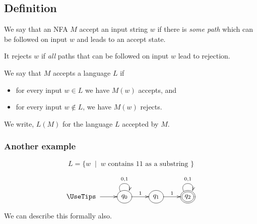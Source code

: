 \documentclass[xcolor=table]{beamer}
\begin{document}
\subsection[definition]{Definition}

\begin{frame}

  \bigskip
  \begin{Definition}
    We say that \alert{an NFA $M$ accept an input string} $w$ if there
    is {\em some path\/} which can be followed on input $w$ and leads
    to an accept state.

    \medskip
    It \alert{rejects} $w$ if {\em all\/} paths that can be followed
	on input $w$ lead to rejection.
  \end{Definition}


  \bigskip
  \begin{Definition}
    We say that
      \alert{$M$ accepts a language $L$} if
      
      \begin{itemize}
	\item for every input $w\in L$ we have $M(w)$ accepts, and
      
	\item for every input $w\not\in L$, we have $M(w)$ rejects. 
      \end{itemize}

      We write, $L(M)$ for the language $L$ accepted by $M$.
      \end{Definition}

  
\end{frame}


\begin{frame}
  \frametitle{Another example}

  \begin{block}{}
  \[ L = \{  w \; \mid \; w \mbox{ contains 11 as a substring } \}\]
  \end{block}

  \[\UseTips
  \xymatrix {
      *+\txt{\ } \ar[r] & *++[o][F]{q_0} \ar@(ul,ur)^{0,1}
  \ar[r]^{1} & *++[o][F]{q_1} \ar[r]^{1} & *++[o][F=]{q_2}\ar@(ul,ur)^{0,1}
  }
  \]  

  \bigskip
  We can describe this formally also.
\end{frame}
\end{document}
